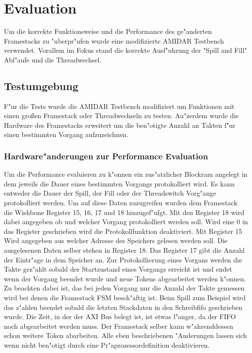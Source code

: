 \chapter{Evaluation}
\label{cha:Evaluation}
Um die korrekte Funktionsweise und die Performance des ge"anderten Framestacks zu "uberpr"ufen wurde eine modifizierte AMIDAR Testbench verwendet. Vorallem im Fokus stand die korrekte Ausf"uhrung der "Spill and Fill" Abl"aufe und die Threadwechsel. 
\section{Testumgebung}
F"ur die Tests wurde die AMIDAR Testbench modifiziert um Funktionen mit einen großen Framestack oder Threadwechseln zu testen. Au"zerdem wurde die Hardware des Framestacks erweitert um die ben"otigte Anzahl an Takten f"ur einen bestimmten Vorgang aufzuzeichnen. 
\subsection{Hardware"anderungen zur Performance Evaluation}
Um die Performance evaluieren zu k"onnen ein zus"atzlicher Blockram angelegt in dem jeweils die Dauer eines bestimmten Vorgangs protokolliert wird. Es kann entweder die Dauer der Spill, der Fill oder der Threadswitch Vorg"ange protokolliert werden. 
Um auf diese Daten zuzugreifen wurden dem Framestack die Wishbone Register 15, 16, 17 und 18 hinzugef"ufgt. Mit den Register 18 wird dabei angegeben ob und welcher Vorgang protokolliert werden soll. Wird eine 0 in das Register geschrieben wird die Protokollfunktion deaktiviert. Mit Register 15 Wird angegeben aus welcher Adresse des Speichers gelesen werden soll. Die ausgelesenen Daten selber stehen in Register 18. Das Register 17 gibt die Anzahl der Eintr"age in dem Speicher an. 
Zur Protokollierung eines Vorgans werden die Takte gez"ahlt sobald der Startzustand eines Vorgangs erreicht ist und endet wenn der Vorgang beendet wurde und neue Tokens abgearbeitet werden k"onnen. Zu beachten dabei ist, das bei jeden Vorgang nur die Anzahl der Takte gemessen wird bei denen die Framestack FSM besch"aftig ist. Beim Spill zum Beispiel wird das z"ahlen beendet sobald die letzten Stackdaten in den Schreibfifo geschrieben wurde. Die Zeit, in der der AXI Bus belegt ist, ist etwas l"anger, da der FIFO noch abgearbeitet werden muss. Der Framestack selber kann w"ahrenddessen schon weitere Token abarbeiten.
Alle eben beschriebenen "Anderungen lassen sich wenn nicht ben"otigt durch eine Pr"aprozessordefinition deaktivieren. 
